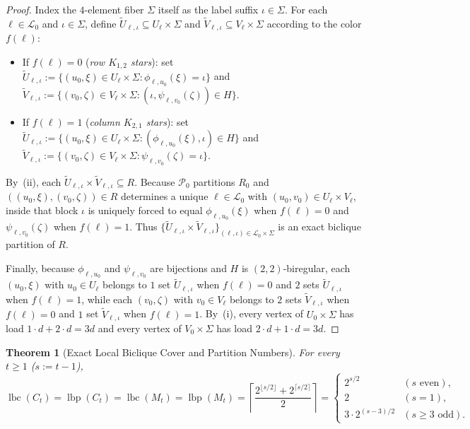 \documentclass[11pt,reqno]{amsart}
\newtheorem{theorem}{Theorem}[section]
\theoremstyle{definition}
\theoremstyle{remark}
\DeclareMathOperator{\lbc}{lbc}
\DeclareMathOperator{\lbp}{lbp}
\numberwithin{equation}{section}
\begin{document}
\begin{proof}
Index the $4$-element fiber $\Sigma$ itself as the label suffix $\iota \in \Sigma$. For each $\ell \in \mathcal{L}_0$ and $\iota \in \Sigma$, define $\widetilde{U}_{\ell, \iota} \subseteq U_\ell \times \Sigma$ and $\widetilde{V}_{\ell, \iota} \subseteq V_\ell \times \Sigma$ according to the color $f(\ell)$:
\begin{itemize}[leftmargin=2em]
  \item If $f(\ell) = 0$ (\emph{row $K_{1,2}$ stars}): set $\widetilde{U}_{\ell, \iota} := \{(u_0, \xi) \in U_\ell \times \Sigma : \phi_{\ell, u_0}(\xi) = \iota\}$ and $\widetilde{V}_{\ell, \iota} := \{(v_0, \zeta) \in V_\ell \times \Sigma : (\iota, \psi_{\ell, v_0}(\zeta)) \in H\}$.
  \item If $f(\ell) = 1$ (\emph{column $K_{2,1}$ stars}): set $\widetilde{U}_{\ell, \iota} := \{(u_0, \xi) \in U_\ell \times \Sigma : (\phi_{\ell, u_0}(\xi), \iota) \in H\}$ and $\widetilde{V}_{\ell, \iota} := \{(v_0, \zeta) \in V_\ell \times \Sigma : \psi_{\ell, v_0}(\zeta) = \iota\}$.
\end{itemize}
By~(ii), each $\widetilde{U}_{\ell, \iota} \times \widetilde{V}_{\ell, \iota} \subseteq R$. Because $\mathcal{P}_0$ partitions $R_0$ and $((u_0, \xi), (v_0, \zeta)) \in R$ determines a unique $\ell \in \mathcal{L}_0$ with $(u_0, v_0) \in U_\ell \times V_\ell$, inside that block $\iota$ is uniquely forced to equal $\phi_{\ell, u_0}(\xi)$ when $f(\ell) = 0$ and $\psi_{\ell, v_0}(\zeta)$ when $f(\ell) = 1$. Thus $\{\widetilde{U}_{\ell, \iota} \times \widetilde{V}_{\ell, \iota}\}_{(\ell, \iota) \in \mathcal{L}_0 \times \Sigma}$ is an exact biclique partition of $R$.

Finally, because $\phi_{\ell, u_0}$ and $\psi_{\ell, v_0}$ are bijections and $H$ is $(2, 2)$-biregular, each $(u_0, \xi)$ with $u_0 \in U_\ell$ belongs to $1$ set $\widetilde{U}_{\ell, \iota}$ when $f(\ell) = 0$ and $2$ sets $\widetilde{U}_{\ell, \iota}$ when $f(\ell) = 1$, while each $(v_0, \zeta)$ with $v_0 \in V_\ell$ belongs to $2$ sets $\widetilde{V}_{\ell, \iota}$ when $f(\ell) = 0$ and $1$ set $\widetilde{V}_{\ell, \iota}$ when $f(\ell) = 1$. By~(i), every vertex of $U_0 \times \Sigma$ has load $1 \cdot d + 2 \cdot d = 3d$ and every vertex of $V_0 \times \Sigma$ has load $2 \cdot d + 1 \cdot d = 3d$.
\end{proof}

\begin{theorem}[Exact Local Biclique Cover and Partition Numbers]
  \label{thm:local-cover}
  For every $t \ge 1$ ($s := t - 1$),
  \begin{equation}
    \label{eq:local-R}
    \lbc(C_t) = \lbp(C_t) = \lbc(M_t) = \lbp(M_t) = \left\lceil \frac{2^{\lfloor s/2 \rfloor} + 2^{\lceil s/2 \rceil}}{2} \right\rceil
    = \begin{cases}
      2^{s/2} & (s\text{ even}), \\
      2 & (s = 1), \\
      3 \cdot 2^{(s-3)/2} & (s \ge 3\text{ odd}).
    \end{cases}
  \end{equation}
\end{theorem}
\end{document}
